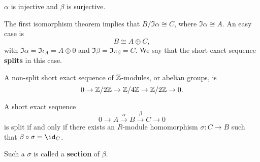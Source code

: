 \begin{note*}
$ \alpha $ is injective and $ \beta $ is surjective.
\end{note*}

\pagebreak

The first isomorphism theorem implies that $ B / \Im \alpha \cong C $, where $ \Im \alpha \cong A $. An easy case is
$$ B \cong A \oplus C, $$
with $ \Im \alpha = \Im \iota_A = A \oplus 0 $ and $ \Im \beta = \Im \pi_\beta = C $. We say that the short exact sequence \textbf{splits} in this case.

\begin{example*}
A non-split short exact sequence of $ \mathbb{Z} $-modules, or abelian groups, is
$$ 0 \to \mathbb{Z} / 2\mathbb{Z} \to \mathbb{Z} / 4\mathbb{Z} \to \mathbb{Z} / 2\mathbb{Z} \to 0. $$
\end{example*}

\begin{proposition}
A short exact sequence
$$ 0 \to A \xrightarrow{\alpha} B \xrightarrow{\beta} C \to 0 $$
is split if and only if there exists an $ R $-module homomorphism $ \sigma : C \to B $ such that $ \beta \circ \sigma = \id_C $.
\end{proposition}

Such a $ \sigma $ is called a \textbf{section} of $ \beta $.

